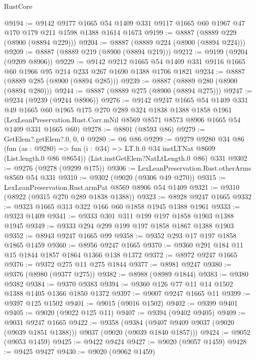 \begin{lexlean}{RustCore}
\begin{coremodule}
@9194 := @9142
    @9177
    @1665
    @54
    @1409
    @331
    @9117
    @1665
    @60
    @1967
    @47
    @170
    @179
    @211
    @1598
    @1388
    @1614
    @1673
@9199 := @8887 (@8889 @229 (@8900 (@8894 @229)))
@9204 := @8887 (@8889 @224 (@8900 (@8894 @224)))
@9209 := @8887 (@8889 @219 (@8900 (@8894 @219)))
@9212 := @9199 (@9204 (@9209 @8906))
@9229 := @9142
    @9212
    @1665
    @54
    @1409
    @331
    @9116
    @1665
    @60
    @1966
    @95
    @214
    @233
    @267
    @1690
    @1388
    @1706
    @1821
@9234 := @8887 (@8889 @285 (@8900 (@8894 @285)))
@9239 := @8887 (@8889 @280 (@8900 (@8894 @280)))
@9244 := @8887 (@8889 @275 (@8900 (@8894 @275)))
@9247 := @9234 (@9239 (@9244 @8906))
@9276 := @9142
    @9247
    @1665
    @54
    @1409
    @331
    @49
    @1665
    @60
    @1965
    @175
    @270
    @289
    @324
    @1838
    @1388
    @1858
    @1961
    (LexLeanPreservation.Rust.Corr.mNil @8569 @8571 @8573 @8906 @1665 @54 @1409 @331 @1665 @60)
@9278 := @8801 (@8593 @86)
@9279 := GetElem?.getElem?.{0, 0, 0}
@9280 := @6 @86
@9299 := @9279
    @9280
    @34
    @86
    (fun (as : @9280) => fun (i : @34) => LT.lt.{0} @34 instLTNat @8609 (List.length.{0} @86 @8654))
    (List.instGetElem?NatLtLength.{0} @86)
    @331
@9302 := @9276 (@9278 (@9299 @175))
@9306 := LexLeanPreservation.Rust.otherArms @8569 @54 @331
@9310 := @9302 (@9020 (@9306 @49 @270))
@9315 := LexLeanPreservation.Rust.armPat @8569 @8906 @54 @1409
@9321 := @9310 (@8922 (@9315 @270 @289 @1838 @1388))
@9323 := @8928 @9247 @1665
@9332 := @9323 @1665 @313 @322 @166 @60 @1858 @1945 @1388 @1961
@9333 := @9323 @1409
@9341 := @9333 @301 @311 @199 @197 @1858 @1903 @1388 @1945
@9349 := @9333 @294 @299 @199 @197 @1858 @1867 @1388 @1903
@9352 := @8943 @9247 @1665 @99
@9358 := @9352 @293 @17 @197 @1858 @1865 @1459
@9360 := @8956 @9247 @1665
@9370 := @9360 @291 @184 @11 @15 @1844 @1857 @1864 @1366 @138 @1372
@9372 := @8972 @9247 @1665
@9376 := @9372 @275 @11 @275 @1844
@9377 := @8981 @9247
@9380 := @9376 (@8980 (@9377 @275))
@9382 := @8988 (@8989 @1844)
@9383 := @9380 @9382
@9384 := @9370 @9383
@9394 := @9360 @126 @77 @11 @14 @1502 @1388 @1405 @1366 @1850 @1372
@9397 := @9007 @9247 @1665 @11
@9399 := @9397 @125 @1502
@9401 := @9015 (@9016 @1502)
@9402 := @9399 @9401
@9405 := @9020 (@9022 @125 @11)
@9407 := @9394 (@9402 @9405)
@9409 := @9031 @9247 @1665
@9422 := @9358
    (@9384 (@9407 @9409 @9037 (@9020 (@9039 @1851 @1388))) @9037 (@9020 (@9039 @1840 @1857)))
@9424 := @9052 (@9053 @1459)
@9425 := @9422 @9424
@9427 := @9020 (@9057 @1459)
@9428 := @9425 @9427
@9430 := @9020 (@9062 @1459)

\end{coremodule}
\end{lexlean}
